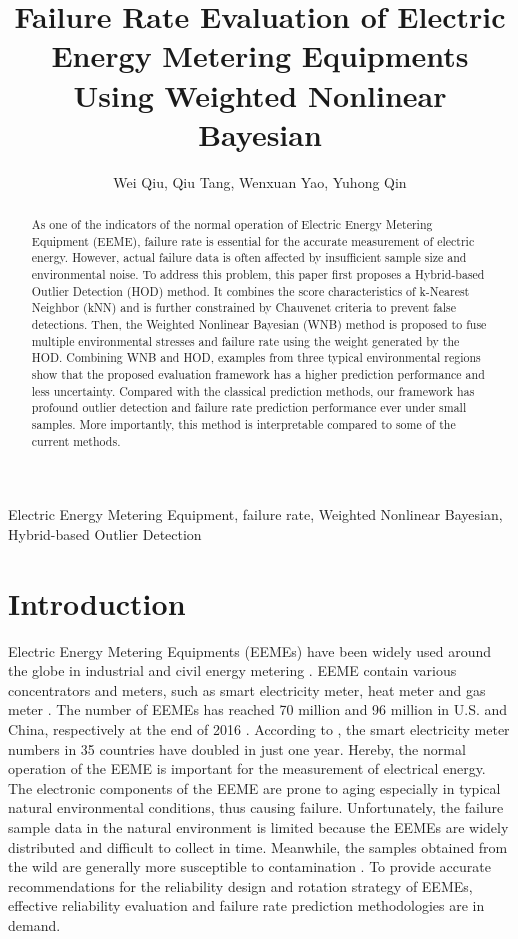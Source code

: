 \documentclass[journal,twoside,web]{ieeecolor}
\begin{document}
\title{Failure Rate Evaluation of Electric Energy Metering Equipments Using Weighted Nonlinear Bayesian}
\author{Wei Qiu, Qiu Tang, Wenxuan Yao, Yuhong Qin
}

\maketitle

\begin{abstract}
As one of the indicators of the normal operation of Electric Energy Metering Equipment (EEME), failure rate is essential for the accurate measurement of electric energy. However, actual failure data is often affected by insufficient sample size and environmental noise.
To address this problem, this paper first proposes a Hybrid-based Outlier Detection (HOD) method. It combines the score characteristics of k-Nearest Neighbor (kNN) and is further constrained by Chauvenet criteria to prevent false detections. 
Then, the Weighted Nonlinear Bayesian (WNB) method is proposed to fuse multiple environmental stresses and failure rate using the weight generated by the HOD. 
Combining WNB and HOD, examples from three typical environmental regions show that the proposed evaluation framework has a higher prediction performance and less uncertainty. 
Compared with the classical prediction methods, our framework has profound outlier detection and failure rate prediction performance ever under small samples.
More importantly, this method is interpretable compared to some of the current methods.


\end{abstract}

\begin{IEEEkeywords}
Electric Energy Metering Equipment, failure rate, Weighted Nonlinear Bayesian, Hybrid-based Outlier Detection
\end{IEEEkeywords}

\section{Introduction}
\label{Section1}
Electric Energy Metering Equipments (EEMEs) have been widely used around the globe in industrial and civil energy metering \cite{8322199}. EEME contain various concentrators and meters, such as smart electricity meter, heat meter and gas meter \cite{7365417}. The number of EEMEs has reached 70 million and 96 million in U.S. and China, respectively at the end of 2016 \cite{8322199}. According to \cite{7063262}, the smart electricity meter numbers in 35 countries have doubled in just one year.
Hereby, the normal operation of the EEME is important for the measurement of electrical energy. The electronic components of the EEME are prone to aging  especially in typical natural environmental conditions, thus causing failure.
Unfortunately, the failure sample data in the natural environment is limited because the EEMEs are widely distributed and difficult to collect in time. Meanwhile, the samples obtained from the wild are generally more susceptible to contamination \cite{6710227}. To provide accurate recommendations for the reliability design and rotation strategy of EEMEs, effective reliability evaluation and failure rate prediction methodologies are in demand.
\end{document}
